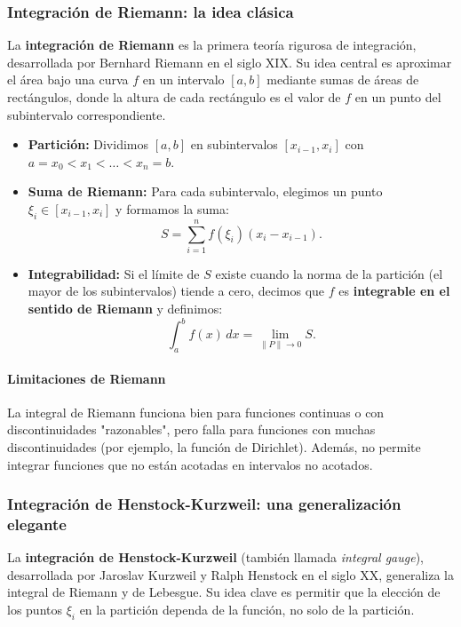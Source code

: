 \documentclass[12pt, a4paper]{article}
\theoremstyle{rioplatense}
\begin{document}
\subsubsection{Integración de Riemann: la idea clásica}
La \textbf{integración de Riemann} es la primera teoría rigurosa de integración, desarrollada por Bernhard Riemann en el siglo XIX. Su idea central es aproximar el área bajo una curva \( f \) en un intervalo \([a, b]\) mediante sumas de áreas de rectángulos, donde la altura de cada rectángulo es el valor de \( f \) en un punto del subintervalo correspondiente.

\begin{itemize}
    \item \textbf{Partición:} Dividimos \([a, b]\) en subintervalos \([x_{i-1}, x_i]\) con \( a = x_0 < x_1 < \ldots < x_n = b \).
    \item \textbf{Suma de Riemann:} Para cada subintervalo, elegimos un punto \( \xi_i \in [x_{i-1}, x_i] \) y formamos la suma:
    \[
    S = \sum_{i=1}^n f(\xi_i) (x_i - x_{i-1}).
    \]
    \item \textbf{Integrabilidad:} Si el límite de \( S \) existe cuando la norma de la partición (el mayor de los subintervalos) tiende a cero, decimos que \( f \) es \textbf{integrable en el sentido de Riemann} y definimos:
    \[
    \int_a^b f(x) \, dx = \lim_{\|P\| \to 0} S.
    \]
\end{itemize}

\paragraph{Limitaciones de Riemann}
La integral de Riemann funciona bien para funciones continuas o con discontinuidades "razonables", pero falla para funciones con muchas discontinuidades (por ejemplo, la función de Dirichlet). Además, no permite integrar funciones que no están acotadas en intervalos no acotados.

\subsubsection{Integración de Henstock-Kurzweil: una generalización elegante}
La \textbf{integración de Henstock-Kurzweil} (también llamada \textit{integral gauge}), desarrollada por Jaroslav Kurzweil y Ralph Henstock en el siglo XX, generaliza la integral de Riemann y de Lebesgue. Su idea clave es permitir que la elección de los puntos \( \xi_i \) en la partición dependa de la función, no solo de la partición.
\end{document}
